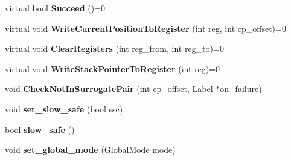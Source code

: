 \begin{DoxyCompactItemize}
\item 
virtual bool {\bfseries Succeed} ()=0\hypertarget{classv8_1_1internal_1_1_reg_exp_macro_assembler_a1e08e084eb2fa2e7ebe538631fcaaefb}{}\label{classv8_1_1internal_1_1_reg_exp_macro_assembler_a1e08e084eb2fa2e7ebe538631fcaaefb}

\item 
virtual void {\bfseries Write\+Current\+Position\+To\+Register} (int reg, int cp\+\_\+offset)=0\hypertarget{classv8_1_1internal_1_1_reg_exp_macro_assembler_ab2c114d6736c553fb03d898c05aa19ec}{}\label{classv8_1_1internal_1_1_reg_exp_macro_assembler_ab2c114d6736c553fb03d898c05aa19ec}

\item 
virtual void {\bfseries Clear\+Registers} (int reg\+\_\+from, int reg\+\_\+to)=0\hypertarget{classv8_1_1internal_1_1_reg_exp_macro_assembler_af27c82d6793671c4e55baa50655943e4}{}\label{classv8_1_1internal_1_1_reg_exp_macro_assembler_af27c82d6793671c4e55baa50655943e4}

\item 
virtual void {\bfseries Write\+Stack\+Pointer\+To\+Register} (int reg)=0\hypertarget{classv8_1_1internal_1_1_reg_exp_macro_assembler_ab20c01102f11c10c5077539e898bf063}{}\label{classv8_1_1internal_1_1_reg_exp_macro_assembler_ab20c01102f11c10c5077539e898bf063}

\item 
void {\bfseries Check\+Not\+In\+Surrogate\+Pair} (int cp\+\_\+offset, \hyperlink{classv8_1_1internal_1_1_label}{Label} $\ast$on\+\_\+failure)\hypertarget{classv8_1_1internal_1_1_reg_exp_macro_assembler_a213197a543acbc5e2aef5e4d2a11096b}{}\label{classv8_1_1internal_1_1_reg_exp_macro_assembler_a213197a543acbc5e2aef5e4d2a11096b}

\item 
void {\bfseries set\+\_\+slow\+\_\+safe} (bool ssc)\hypertarget{classv8_1_1internal_1_1_reg_exp_macro_assembler_a5b98ff624af82e98e5fb7369aba4f334}{}\label{classv8_1_1internal_1_1_reg_exp_macro_assembler_a5b98ff624af82e98e5fb7369aba4f334}

\item 
bool {\bfseries slow\+\_\+safe} ()\hypertarget{classv8_1_1internal_1_1_reg_exp_macro_assembler_a514e68e2f362575d6666a85cc4366e6e}{}\label{classv8_1_1internal_1_1_reg_exp_macro_assembler_a514e68e2f362575d6666a85cc4366e6e}

\item 
void {\bfseries set\+\_\+global\+\_\+mode} (Global\+Mode mode)\hypertarget{classv8_1_1internal_1_1_reg_exp_macro_assembler_a4fa0c060dbcabb9dac145301a719c37f}{}\label{classv8_1_1internal_1_1_reg_exp_macro_assembler_a4fa0c060dbcabb9dac145301a719c37f}


\end{DoxyCompactItemize}

